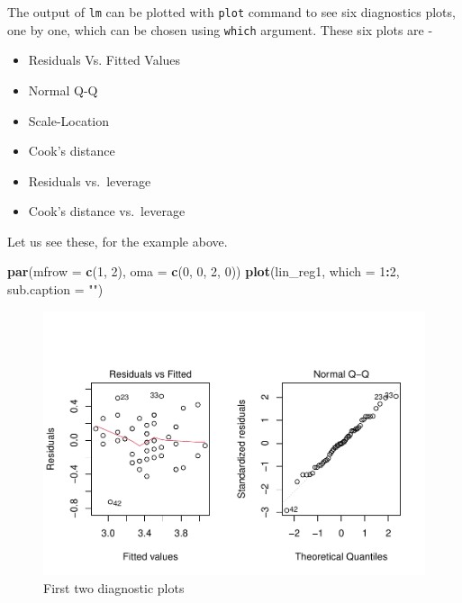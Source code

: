 \documentclass[
]{book}
\newenvironment{Shaded}{\begin{snugshade}}{\end{snugshade}}
\newcommand{\AttributeTok}[1]{\textcolor[rgb]{0.13,0.29,0.53}{#1}}
\newcommand{\DecValTok}[1]{\textcolor[rgb]{0.00,0.00,0.81}{#1}}
\newcommand{\FunctionTok}[1]{\textcolor[rgb]{0.13,0.29,0.53}{\textbf{#1}}}
\newcommand{\NormalTok}[1]{#1}
\newcommand{\SpecialCharTok}[1]{\textcolor[rgb]{0.81,0.36,0.00}{\textbf{#1}}}
\newcommand{\StringTok}[1]{\textcolor[rgb]{0.31,0.60,0.02}{#1}}
\providecommand{\tightlist}{%
  \setlength{\itemsep}{0pt}\setlength{\parskip}{0pt}}
\begin{document}
The output of \texttt{lm} can be plotted with \texttt{plot} command to see six diagnostics plots, one by one, which can be chosen using \texttt{which} argument. These six plots are -

\begin{itemize}
\tightlist
\item
  Residuals Vs. Fitted Values
\item
  Normal Q-Q
\item
  Scale-Location
\item
  Cook's distance
\item
  Residuals vs.~leverage
\item
  Cook's distance vs.~leverage
\end{itemize}

Let us see these, for the example above.

\begin{Shaded}
\begin{Highlighting}[]
\FunctionTok{par}\NormalTok{(}\AttributeTok{mfrow =} \FunctionTok{c}\NormalTok{(}\DecValTok{1}\NormalTok{, }\DecValTok{2}\NormalTok{), }\AttributeTok{oma =} \FunctionTok{c}\NormalTok{(}\DecValTok{0}\NormalTok{, }\DecValTok{0}\NormalTok{, }\DecValTok{2}\NormalTok{, }\DecValTok{0}\NormalTok{))}
\FunctionTok{plot}\NormalTok{(lin\_reg1, }\AttributeTok{which =} \DecValTok{1}\SpecialCharTok{:}\DecValTok{2}\NormalTok{, }\AttributeTok{sub.caption =} \StringTok{""}\NormalTok{)}
\end{Highlighting}
\end{Shaded}

\begin{figure}

{\centering \includegraphics[height=0.4\textheight]{DauR_files/figure-latex/plots1-1} 

}

\caption{First two diagnostic plots}\label{fig:plots1}
\end{figure}
\end{document}
